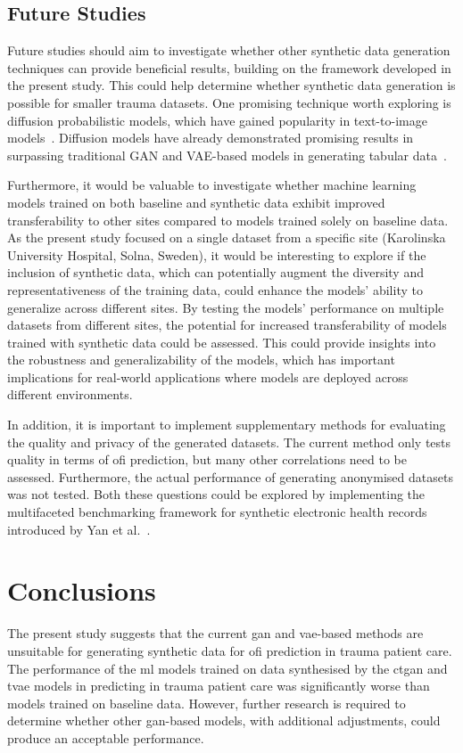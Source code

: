 \documentclass[12pt, a4paper]{article}
\begin{document}
\subsection{Future Studies}
Future studies should aim to investigate whether other synthetic data generation techniques can provide beneficial
results, building on the framework developed in the present study. This could help determine whether synthetic data
generation is possible for smaller trauma datasets. One promising technique worth exploring is diffusion probabilistic
models, which have gained popularity in text-to-image models~\cite{rombach_high-resolution_2022,
	ramesh_hierarchical_2022}. Diffusion models have already demonstrated promising results in surpassing traditional GAN
and VAE-based models in generating tabular data~\cite{kotelnikov_tabddpm_2022}.

Furthermore, it would be valuable to investigate whether machine learning models trained on both baseline and synthetic
data exhibit improved transferability to other sites compared to models trained solely on baseline data. As the present
study focused on a single dataset from a specific site (Karolinska University Hospital, Solna, Sweden), it would be
interesting to explore if the inclusion of synthetic data, which can potentially augment the diversity and
representativeness of the training data, could enhance the models' ability to generalize across different sites. By
testing the models' performance on multiple datasets from different sites, the potential for increased transferability
of models trained with synthetic data could be assessed. This could provide insights into the robustness and
generalizability of the models, which has important implications for real-world applications where models are deployed
across different environments.

In addition, it is important to implement supplementary methods for evaluating the quality and privacy of the generated
datasets. The current method only tests quality in terms of \acrshort{ofi} prediction, but many other correlations need
to be assessed. Furthermore, the actual performance of generating anonymised datasets was not tested. Both these
questions could be explored by implementing the multifaceted benchmarking framework for synthetic electronic health
records introduced by Yan et al.~\cite{yan_multifaceted_2022}.

\section{Conclusions}
The present study suggests that the current \acrshort{gan} and \acrshort{vae}-based methods are unsuitable for
generating synthetic data for \acrshort{ofi} prediction in trauma patient care. The performance of the \acrshort{ml}
models trained on data synthesised by the \acrshort{ctgan} and \acrshort{tvae} models in predicting  in
trauma patient care was significantly worse than models trained on baseline data. However, further research is required
to determine whether other \acrshort{gan}-based models, with additional adjustments, could produce an acceptable
performance.
\end{document}
